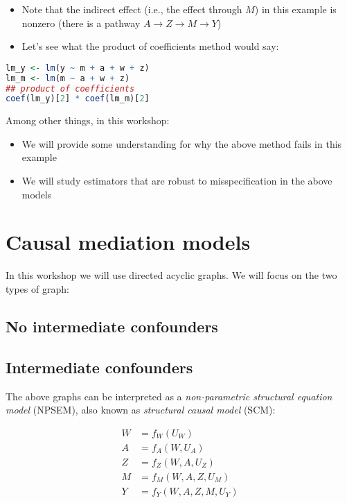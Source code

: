 \documentclass[
  12pt,
]{book}
\providecommand{\tightlist}{%
  \setlength{\itemsep}{0pt}\setlength{\parskip}{0pt}}
\theoremstyle{definition}
\theoremstyle{definition}
\theoremstyle{definition}
\newcommand{\1}{\mathbbm{1}}
\begin{document}
\begin{itemize}
\tightlist
\item
  Note that the indirect effect (i.e., the effect through \(M\)) in this example
  is nonzero (there is a pathway \(A\rightarrow Z \rightarrow M \rightarrow Y\))
\item
  Let's see what the product of coefficients method would say:
\end{itemize}

\begin{lstlisting}[language=R]
lm_y <- lm(y ~ m + a + w + z)
lm_m <- lm(m ~ a + w + z)
## product of coefficients
coef(lm_y)[2] * coef(lm_m)[2]
\end{lstlisting}

Among other things, in this workshop:

\begin{itemize}
\tightlist
\item
  We will provide some understanding for why the above method fails in this example
\item
  We will study estimators that are robust to misspecification in the above models
\end{itemize}

\hypertarget{causal-mediation-models}{%
\section{Causal mediation models}\label{causal-mediation-models}}

In this workshop we will use directed acyclic graphs. We will focus on the two
types of graph:

\hypertarget{no-intermediate-confounders}{%
\subsection{No intermediate confounders}\label{no-intermediate-confounders}}

\hypertarget{intermediate-confounders}{%
\subsection{Intermediate confounders}\label{intermediate-confounders}}

The above graphs can be interpreted as a \emph{non-parametric structural equation model}
(NPSEM), also known as \emph{structural causal model} (SCM):

\begin{align}
  W & = f_W(U_W)\\
  A & = f_A(W, U_A)\\
  Z & = f_Z(W, A, U_Z)\\
  M & = f_M(W, A, Z, U_M)\\
  Y & = f_Y(W, A, Z, M, U_Y)
\end{align}
\end{document}
